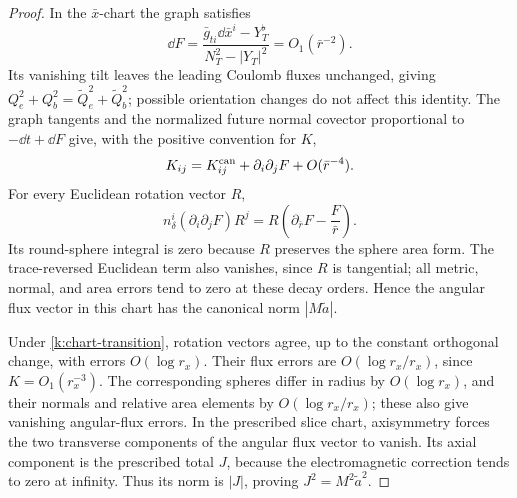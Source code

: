 \begin{proof}
In the \(\bar x\)-chart the graph satisfies
\begin{equation}\label{k:graph-gradient}
 \dd F=
 \frac{\bar g_{ti}\dd\bar x^i-Y_T^\flat}
                  {N_T^2-|Y_T|^2}
             =O_1(\bar r^{-2}).
\end{equation}
Its vanishing tilt leaves the leading Coulomb fluxes
unchanged, giving
\(Q_e^2+Q_b^2=\widetilde Q_e^2+\widetilde Q_b^2\);
possible orientation changes do not affect this identity.
The graph tangents and the normalized future normal
covector proportional to \(-\dd t+\dd F\) give, with the
positive convention for \(K\),
\begin{equation}\label{k:graph-tensor}
 K_{ij}=K^{\rm can}_{ij}+\partial_i\partial_jF
                                  +O(\bar r^{-4}).
\end{equation}
For every Euclidean rotation vector \(R\),
\[
 n_\delta^i(\partial_i\partial_jF)R^j
       =R\left(\partial_{\bar r}F-\frac{F}{\bar r}\right).
\]
Its round-sphere integral is zero because \(R\) preserves
the sphere area form. The trace-reversed Euclidean term
also vanishes, since \(R\) is tangential; all metric,
normal, and area errors tend to zero at these decay orders.
Hence the angular flux vector in this chart has the
canonical norm \(|M\widetilde a|\).

Under \eqref{k:chart-transition}, rotation vectors agree,
up to the constant orthogonal change, with errors
\(O(\log r_x)\). Their flux errors are
\(O(\log r_x/r_x)\), since \(K=O_1(r_x^{-3})\).
The corresponding spheres differ in radius by
\(O(\log r_x)\), and their normals and relative area
elements by \(O(\log r_x/r_x)\); these also give vanishing
angular-flux errors. In the prescribed slice chart,
axisymmetry forces the two transverse components of the
angular flux vector to vanish. Its axial component is
the prescribed total \(J\), because the electromagnetic
correction tends to zero at infinity. Thus its norm is
\(|J|\), proving \(J^2=M^2\widetilde a^2\).
\end{proof}

